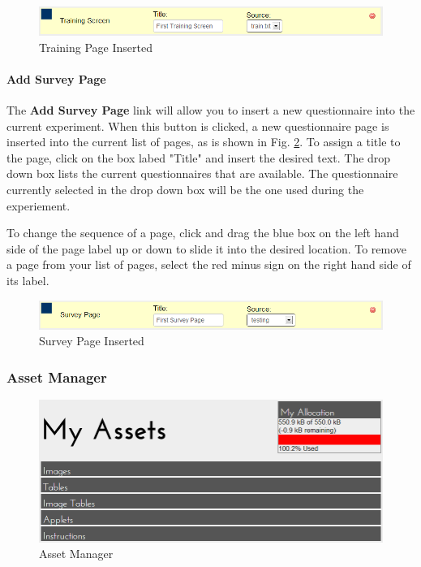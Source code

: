 \documentclass[article]{ij4uq}              %
\begin{document}
\begin{figure}[h!]
 \centering
 \includegraphics[width=5.0in]{figures/add_training.png}
 \caption{Training Page Inserted}
 \label{fig:trainInsert}
\end{figure}
\FloatBarrier

\paragraph{Add Survey Page}

The \textbf{Add Survey Page} link will allow you to insert a new questionnaire into the current experiment. When this button is clicked, a new questionnaire page is inserted into the current list of pages, as is shown in Fig. \ref{fig:surveyInsert}.   To assign a title to the page, click on the box labed "Title" and insert the desired text.  The drop down box lists the current questionnaires  that are available.  The questionnaire currently selected in the drop down box will be the one used during the experiement.

To change the sequence of a page, click and drag the blue box on the left hand side of the page label up or down to slide it into the desired location. To remove a page from your list of pages, select the red minus sign on the right hand side of its label.

\begin{figure}[h!]
 \centering
 \includegraphics[width=5.0in]{figures/add_survey.png}
 \caption{Survey Page Inserted}
 \label{fig:surveyInsert}
\end{figure}
\FloatBarrier

\subsubsection {Asset Manager}

\begin{figure}[h!]
 \centering
 \includegraphics[width=5.0in]{figures/manage_assets.png}
 \caption{Asset Manager}
 \label{fig:manageAsset}
\end{figure}
\FloatBarrier
\end{document}

